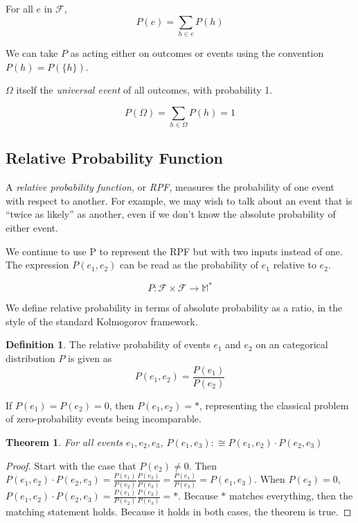 \documentclass[twoside]{article}
\newcommand{\quotes}[1]{``#1''}
\theoremstyle{plain}%
\newtheorem{theorem}{Theorem}[section]
\theoremstyle{definition}
\newtheorem{definition}{Definition}[section]
\theoremstyle{remark}
\begin{document}
For all \(e\) in \(\mathcal{F}\),
\[ P(e) = \sum_{h \in e}{P(h)}\]

We can take \(P\) as acting either on outcomes or events using the convention \(P(h) = P(\{h\})\).

\(\Omega\) itself the \textit{universal event} of all outcomes, with probability 1.

\[P(\Omega) = \sum_{h \in \Omega}{P(h)} = 1\]

\subsection{Relative Probability Function}
\label{section:standard_relative_prob}

A \textit{relative probability function}, or \textit{RPF}, measures the probability of one event with respect to another. For example, we may wish to talk about an event that is \quotes{twice as likely} as another, even if we don't know the absolute probability of either event.

We continue to use P to represent the RPF but with two inputs instead of one. The expression \(P(e_1, e_2)\) can be read as the probability of \(e_1\) relative to \(e_2\).

\[P: \mathcal{F} \times \mathcal{F} \rightarrow \mathbb{M}^*\]

We define relative probability in terms of absolute probability as a ratio, in the style of the standard Kolmogorov framework.

\begin{definition}
\label{def:ratio}
The relative probability of events \(e_1\) and \(e_2\) on an categorical distribution \(P\) is given as
\[P(e_1, e_2) = \frac{P(e_1)}{P(e_2)}\]
\end{definition}

If \(P(e_1) = P(e_2) = 0\), then \(P(e_1, e_2) = \ast\), representing the classical problem of zero-probability events being incomparable.

\begin{theorem}
For all events \(e_1, e_2, e_3\), \(P(e_1, e_3) :\cong P(e_1, e_2) \cdot P(e_2, e_3)\)
\end{theorem}

\begin{proof}
Start with the case that \(P(e_2)\neq 0\). Then \(P(e_1, e_2) \cdot P(e_2, e_3) = \frac{P(e_1)}{P(e_2)}\frac{P(e_2)}{P(e_3)} = \frac{P(e_1)}{P(e_3)} = P(e_1, e_3)\). When \(P(e_2) = 0\), \(P(e_1, e_2) \cdot P(e_2, e_3) = \frac{P(e_1)}{P(e_2)}\frac{P(e_2)}{P(e_3)} = \ast\). Because \(\ast\) matches everything, then the matching statement holds. Because it holds in both cases, the theorem is true.
\end{proof}
\end{document}
